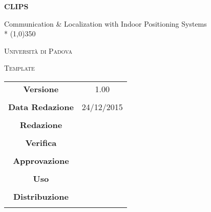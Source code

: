 \documentclass[a4paper,12pt]{article}
\author{Nome Autore}
\date{05/01/2016}
\begin{document}
\begin{titlepage}
	\centering
	{\huge\bfseries CLIPS\par}
	Communication \& Localization with Indoor Positioning Systems \\*
	\line(1,0){350} \\
	{\scshape\LARGE Università di Padova \par}
	\vspace{1cm}
	{\scshape\Large Template \par}
	
	\vspace{1.5cm}
	\logo
	\vspace{2cm}
		
	\vfill \vfill
	\begin{tabular}{c|c}
		{\hfill \textbf{Versione}} 			& 1.00				\\ \\
		{\hfill\textbf{Data Redazione}} 		& 24/12/2015  		\\ \\
		{\hfill\textbf{Redazione}} 			&  					\\ \\
		{\hfill\textbf{Verifica}} 				&  					\\ \\
		{\hfill\textbf{Approvazione}} 		&  					\\ \\
		{\hfill\textbf{Uso}} 					& 					\\ \\
		{\hfill\textbf{Distribuzione}} 			& 					\\ \\
	\end{tabular}
\end{titlepage}
	
	\newpage

	\tableofcontents
	
	\label{LastFrontPage}
	

	\newpage
	
	\pagestyle{mymain}
	

		
	\label{LastPage}
\end{document}

